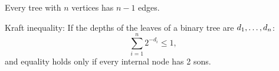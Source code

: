 Every tree with $n$ vertices has $n-1$ edges.
\par\vskip 3pt
Kraft inequality:
If the depths of the leaves of a binary tree are $d_1 ,\ldots, d_n$:
$$
\sum_{i=1}^n 2^{- d_i} \leq 1,
$$
and equality holds only if every internal node has 2 sons.
